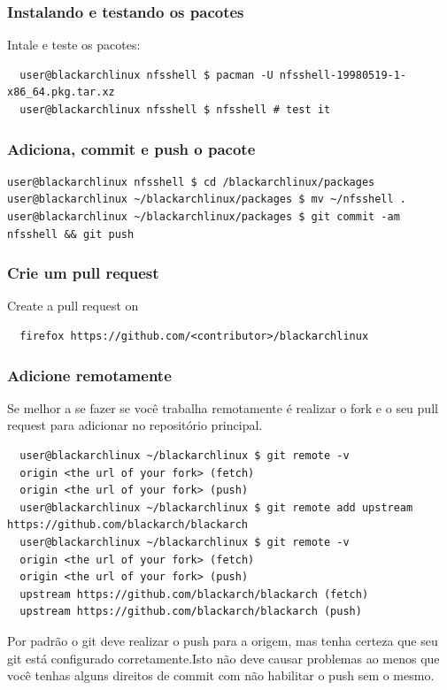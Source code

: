 \documentclass[a4paper, oneside, 11pt]{book}
\def\href#1#2{\htmladdnormallink{#2}{#1}}
\begin{document}
\subsubsection{Instalando e testando os pacotes}
Intale e teste os pacotes:
\begin{lstlisting}
  user@blackarchlinux nfsshell $ pacman -U nfsshell-19980519-1-x86_64.pkg.tar.xz
  user@blackarchlinux nfsshell $ nfsshell # test it
\end{lstlisting}

\subsubsection{Adiciona, commit e push o pacote}
\begin{lstlisting}user@blackarchlinux nfsshell $ cd /blackarchlinux/packages
user@blackarchlinux ~/blackarchlinux/packages $ mv ~/nfsshell .
user@blackarchlinux ~/blackarchlinux/packages $ git commit -am nfsshell && git push
\end{lstlisting}

\subsubsection{Crie um pull request}
Create a pull request on \href{https://github.com/}{github.com}
\begin{lstlisting}
  firefox https://github.com/<contributor>/blackarchlinux
\end{lstlisting}

\subsubsection{Adicione remotamente}
Se melhor a se fazer se você trabalha remotamente é realizar o fork e o seu pull request para adicionar no repositório principal.
\begin{lstlisting}
  user@blackarchlinux ~/blackarchlinux $ git remote -v
  origin <the url of your fork> (fetch)
  origin <the url of your fork> (push)
  user@blackarchlinux ~/blackarchlinux $ git remote add upstream https://github.com/blackarch/blackarch
  user@blackarchlinux ~/blackarchlinux $ git remote -v
  origin <the url of your fork> (fetch)
  origin <the url of your fork> (push)
  upstream https://github.com/blackarch/blackarch (fetch)
  upstream https://github.com/blackarch/blackarch (push)
\end{lstlisting}

Por padrão o git deve realizar o push para a origem, mas tenha certeza que seu git
está configurado corretamente.Isto não deve causar problemas ao menos que você tenhas
alguns direitos de commit com não habilitar o push sem o mesmo.
\end{document}
